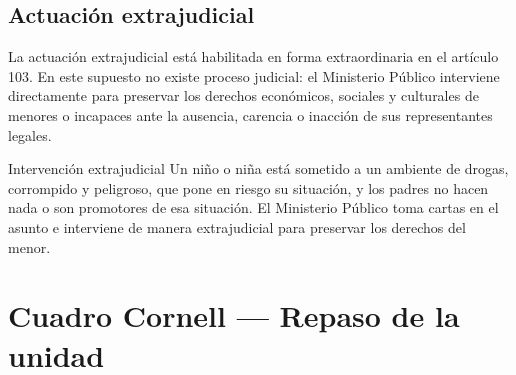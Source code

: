 \documentclass[12pt,oneside]{book}
\begin{document}
\subsection{Actuación extrajudicial}

La actuación extrajudicial está habilitada en forma extraordinaria en el artículo 103. En este supuesto no existe proceso judicial: el Ministerio Público interviene directamente para preservar los derechos económicos, sociales y culturales de menores o incapaces ante la ausencia, carencia o inacción de sus representantes legales.

\begin{example}{Intervención extrajudicial}
Un niño o niña está sometido a un ambiente de drogas, corrompido y peligroso, que pone en riesgo su situación, y los padres no hacen nada o son promotores de esa situación. El Ministerio Público toma cartas en el asunto e interviene de manera extrajudicial para preservar los derechos del menor.
\end{example}

\section{Cuadro Cornell --- Repaso de la unidad}
\end{document}
